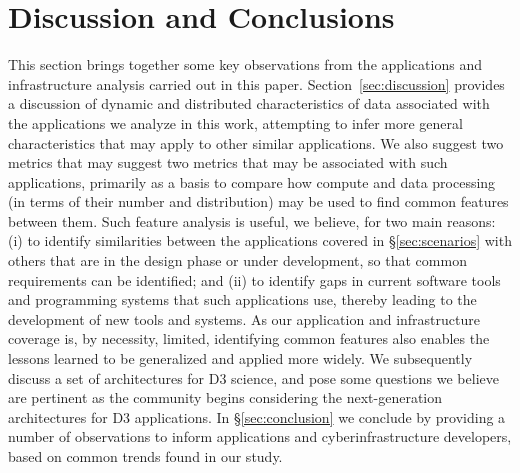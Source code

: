 %


\section{Discussion and Conclusions} \label{sec:conclusions}




This section brings together some key observations
from the applications and infrastructure
analysis carried out in this paper.
Section~\ref{sec:discussion}
provides a discussion of dynamic and distributed characteristics of
data associated with the applications we analyze in this work,
attempting to infer more general characteristics that %
may apply
to other similar applications.  We also suggest two metrics that may
suggest two metrics that may
be associated with such applications, primarily as a basis to compare
how compute and data processing (in terms of their number and
distribution) may be used to find common features between them. Such
feature analysis is useful, we believe, for two main reasons: (i) to
identify similarities between the applications covered in
\S\ref{sec:scenarios} with others that are in the design phase or
under development, so that common requirements can be identified; and
(ii) to identify gaps in current software tools and programming
systems that such applications use, thereby leading to the
development of new tools and systems. As our application and
infrastructure coverage is, by necessity, limited, identifying common
features also enables the lessons learned to be generalized and
applied more widely. We subsequently discuss a set of architectures
for D3 science, and pose some questions we believe are pertinent as
the community begins considering the next-generation
architectures for D3 applications. In
\S\ref{sec:conclusion} we conclude by providing a number of
observations to inform applications and
cyberinfrastructure developers, based on common trends found in our study.

